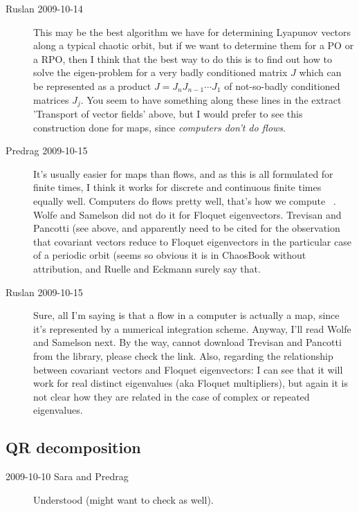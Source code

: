 \begin{description}
  \item[Ruslan 2009-10-14]
 This may be the best
algorithm we have for determining Lyapunov vectors along a
typical chaotic orbit, but if we want to determine them for a
PO or a RPO, then I think that the best way to do this is to
find out how to solve the eigen-problem for a very badly
conditioned matrix $J$ which can be represented as a product
$J = J_{n}J_{n-1}\cdots J_1$ of not-so-badly conditioned
matrices $J_j$.  You seem to have something along these lines
in the extract 'Transport of vector fields' above, but I
would prefer to see this construction done for maps, since
\emph{computers don't do flows}.


\item[Predrag 2009-10-15]
It's usually easier for maps than flows, and as this is all
formulated for finite times, I think it works for discrete
and continuous finite times equally well. Computers do flows
pretty well, that's how we compute \FloquetM\ \monodromy.
Wolfe and Samelson did not do it for Floquet
eigenvectors. Trevisan and Pancotti (see above, and
 apparently need to be cited for the
observation that covariant vectors reduce to Floquet
eigenvectors in the particular case of a periodic orbit
(seems so obvious it is in ChaosBook without attribution, and
Ruelle and Eckmann surely say that.

\item[Ruslan 2009-10-15]
Sure, all I'm saying is that a flow in a computer is actually
a map, since it's represented by a numerical integration
scheme.  Anyway, I'll read Wolfe and Samelson
next.  By the way, cannot download Trevisan and Pancotti from
the library, please check the link.  Also, regarding the
relationship between  covariant vectors and Floquet
eigenvectors: I can see that it will work for real distinct
eigenvalues (aka Floquet multipliers), but again it is not
clear how they are related in the case of complex or repeated
eigenvalues.

\end{description}


\subsection{QR decomposition}

\begin{description}
\item[2009-10-10 Sara and Predrag] Understood
 (might want to
check  as well).
\end{description}

